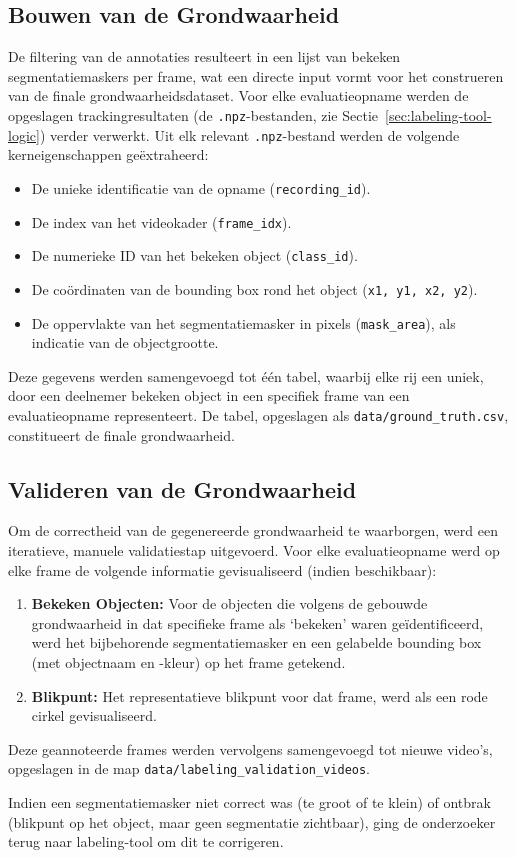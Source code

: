 \subsection{Bouwen van de Grondwaarheid}

De filtering van de annotaties resulteert in een lijst van bekeken segmentatiemaskers per frame,
wat een directe input vormt voor het construeren van de finale grondwaarheidsdataset.
Voor elke evaluatieopname werden de opgeslagen trackingresultaten 
(de \texttt{.npz}-bestanden, zie Sectie~\ref{sec:labeling-tool-logic}) verder verwerkt. 
Uit elk relevant \texttt{.npz}-bestand werden de volgende kerneigenschappen geëxtraheerd:
\begin{itemize}
  \item De unieke identificatie van de opname (\texttt{recording\_id}).
  \item De index van het videokader (\texttt{frame\_idx}).
  \item De numerieke ID van het bekeken object (\texttt{class\_id}).
  \item De coördinaten van de bounding box rond het object (\texttt{x1, y1, x2, y2}).
  \item De oppervlakte van het segmentatiemasker in pixels (\texttt{mask\_area}), als indicatie van de objectgrootte.
\end{itemize}

Deze gegevens werden samengevoegd tot één tabel, waarbij elke rij een uniek, door een deelnemer bekeken object 
in een specifiek frame van een evaluatieopname representeert. 
De tabel, opgeslagen als \texttt{data/ground\_truth.csv}, constitueert de finale grondwaarheid.

\subsection{Valideren van de Grondwaarheid}

Om de correctheid van de gegenereerde grondwaarheid te waarborgen, werd een iteratieve, manuele validatiestap uitgevoerd.
Voor elke evaluatieopname werd op elke frame de volgende informatie gevisualiseerd (indien beschikbaar):
\begin{enumerate}
  \item \textbf{Bekeken Objecten:} Voor de objecten die volgens de gebouwde grondwaarheid in dat specifieke frame als `bekeken' 
  waren geïdentificeerd, werd het bijbehorende segmentatiemasker en een gelabelde bounding box (met objectnaam en -kleur) op het frame getekend.
  \item \textbf{Blikpunt:} Het representatieve blikpunt voor dat frame, werd als een rode cirkel gevisualiseerd.
\end{enumerate}
Deze geannoteerde frames werden vervolgens samengevoegd tot nieuwe video's, opgeslagen in de map \texttt{data/labeling\_validation\_videos}. 

Indien een segmentatiemasker niet correct was (te groot of te klein) of ontbrak (blikpunt op het object, maar geen segmentatie zichtbaar),
ging de onderzoeker terug naar labeling-tool om dit te corrigeren.